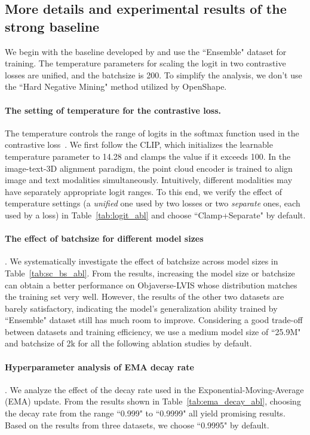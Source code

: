 \documentclass{article} \usepackage{iclr2024_conference,times}
\begin{document}
\subsection{More details and experimental results of the strong baseline}
We begin with the baseline developed by \citet{openshape} and use the ``Ensemble" dataset for training.
The temperature parameters for scaling the logit in two contrastive losses are unified, and the batchsize is 200.  
To simplify the analysis, we don't use the ``Hard Negative Mining" method utilized by OpenShape.

\paragraph{The setting of temperature for the contrastive loss.}
The temperature controls the range of logits in the softmax function used in the contrastive loss~\citep{openai_clip}.
We first follow the CLIP, which initializes the learnable temperature parameter to 14.28 and clamps the value if it exceeds 100.
In the image-text-3D alignment paradigm, the point cloud encoder is trained to align image and text modalities simultaneously. 
Intuitively, different modalities may have separately appropriate logit ranges.
To this end, we verify the effect of temperature settings (a \textit{unified} one used by two losses or two \textit{separate} ones, each used by a loss) in Table~\ref{tab:logit_abl} and choose ``Clamp+Separate" by default.

\paragraph{The effect of batchsize for different model sizes}.
We systematically investigate the effect of batchsize across model sizes in Table~\ref{tab:sc_bs_abl}.
From the results, increasing the model size or batchsize can obtain a better performance on Objaverse-LVIS whose distribution matches the training set very well.
However, the results of the other two datasets are barely satisfactory, indicating the model's generalization ability trained by ``Ensemble" dataset still has much room to improve.
Considering a good trade-off between datasets and training efficiency, we use a medium model size of ``25.9M" and batchsize of 2k for all the following ablation studies by default.

\paragraph{Hyperparameter analysis of EMA decay rate}.
We analyze the effect of the decay rate used in the Exponential-Moving-Average (EMA) update. 
From the results shown in Table~\ref{tab:ema_decay_abl}, choosing the decay rate from the range ``0.999" to ``0.9999" all yield promising results. 
Based on the results from three datasets, we choose ``0.9995" by default.
\end{document}
